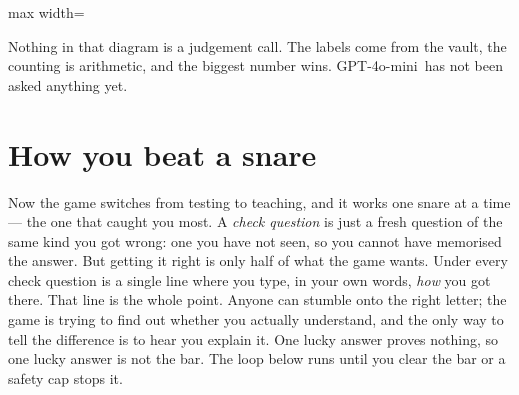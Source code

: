 \documentclass[11pt]{article}
\newcommand{\themodel}{GPT-4o-mini}
\begin{document}
\vspace{0.5em}
\begin{center}
\begin{adjustbox}{max width=\textwidth}
\end{adjustbox}
\end{center}

Nothing in that diagram is a judgement call. The labels come from the vault,
the counting is arithmetic, and the biggest number wins. \themodel\ has not
been asked anything yet.

\section{How you beat a snare}

Now the game switches from testing to teaching, and it works one snare at a
time --- the one that caught you most. A \emph{check question} is just a fresh
question of the same kind you got wrong: one you have not seen, so you cannot
have memorised the answer. But getting it right is only half of what the game
wants. Under every check question is a single line where you type, in your own
words, \emph{how} you got there. That line is the whole point. Anyone can
stumble onto the right letter; the game is trying to find out whether you
actually understand, and the only way to tell the difference is to hear you
explain it. One lucky answer proves nothing, so one lucky answer is not the bar.
The loop below runs until you clear the bar or a safety cap stops it.
\end{document}
